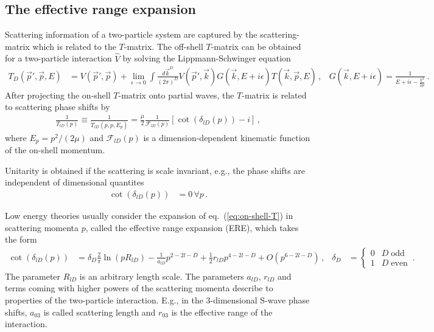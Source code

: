 \subsection{The effective range expansion}
Scattering information of a two-particle system are captured by the scattering-matrix which is related to the $T$-matrix.
The off-shell $T$-matrix can be obtained for a two-particle interaction $\hat V$ by solving the Lippmann-Schwinger equation
\begin{align}
	T_D(\vec p', \vec p, E)
	&=
	V(\vec p', \vec p) + \lim\limits_{\epsilon \to 0}\int \frac{d \vec k^D}{(2\pi)^D} V(\vec p', \vec k) G(\vec k, E + i \epsilon) T(\vec k, \vec p, E) \, ,
	&
	G(\vec k, E+ i \epsilon) = \frac{1}{E + i \epsilon - \frac{k^2}{2\mu}}
	\, .
\end{align}
After projecting the on-shell $T$-matrix onto partial waves,
the $T$-matrix is related to scattering phase shifts by
\begin{align}\label{eq:on-shell-T}
	\frac{1}{T_{lD}(p)}
    \equiv
    \frac{1}{T_{lD}(p, p, E_p)}
    = \frac{\mu}{2}
    \frac{1}{\mathcal F_{l D}(p)} \left[\cot (\delta_{l D}(p)) - i\right] \, ,
\end{align}
where $E_p = p^2 / (2 \mu)$ and $\mathcal F_{l D}(p)$ is a dimension-dependent kinematic function of the on-shell momentum.

Unitarity is obtained if the scattering is scale invariant, e.g., the phase shifts are independent of dimensional quantites
\begin{align}
    \cot (\delta_{l D}(p)) &= 0
    \, \forall p\,.
\end{align}

Low energy theories usually consider the expansion of eq.~(\ref{eq:on-shell-T}) in scattering momenta $p$, called the effective range expansion (ERE), which takes the form \cite{Hammer:2010fw}
\begin{align}
    \cot \left(\delta_{l D}(p)\right)
    &=
    \delta_D \frac{2}{\pi}  \ln \left(p R_{l D}\right)
    -
    \frac{1}{a_{l D}} p^{2 - 2 l - D} +\frac{1}{2} r_{l D} p^{4 - 2 l - D} + O\left(p^{6 - 2 l - D}\right)
    \, , &
    \delta_D &= \begin{cases}
        0 & D \;\text{odd} \\ 1 & D \;\text{even}
    \end{cases}
    \, .
\end{align}
The parameter $R_{l D}$ is an arbitrary length scale.
The parameters $a_{l D}$, $r_{l D}$ and terms coming with higher powers of the scattering momenta describe to properties of the two-particle interaction.
E.g., in the 3-dimensional S-wave phase shifts, $a_{03}$ is called scattering length and $r_{0 3}$ is the effective range of the interaction.
